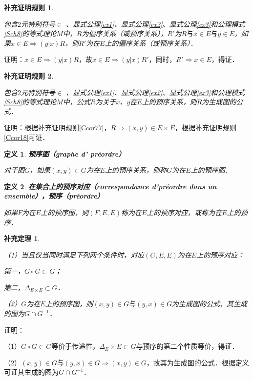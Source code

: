 \documentclass[12pt, a4paper, oneside]{book}
\newtheorem{Ccor}{补充证明规则}
\newtheorem{cor}{补充定理}
\newtheorem{de}{定义}
\begin{document}
			\begin{Ccor}\label{Ccor79}
				\hfill\par
				包含$2$元特别符号$\in$ 、显式公理\ref{ex1}、显式公理\ref{ex2}、显式公理\ref{ex3}和公理模式\ref{Sch8}的等式理论$M$中，$R$为偏序关系（或预序关系），$R'$为$R\text{与}x\in E\text{与}y\in E$，如果$x\in E\Rightarrow (y|x)R$，则$R'$为在$E$上的偏序关系（或预序关系）．
			\end{Ccor}
			证明：$x\in E\Rightarrow (y|x)R$，故$x\in E\Rightarrow (y|x)R'$，同时，$R'\Rightarrow x\in E$，得证．
			
			\begin{Ccor}\label{Ccor80}
				\hfill\par
				包含$2$元特别符号$\in$ 、显式公理\ref{ex1}、显式公理\ref{ex2}、显式公理\ref{ex3}和公理模式\ref{Sch8}的等式理论$M$中，公式$R$为关于$x$、$y$在$E$上的预序关系，则$R$为生成图的公式．
			\end{Ccor}
			证明：根据补充证明规则\ref{Ccor77}，$R\Rightarrow (x, y)\in E\times E$，根据补充证明规则\ref{Ccor18}可证．

			\begin{de}
				\textbf{预序图（graphe d' préordre）}
				\par
				对于图$G$，如果$(x, y)\in G$为在$E$上的预序关系，则称$G$为在$E$上的预序图．
			\end{de}

			\begin{de}
				\textbf{在集合上的预序对应（correspondance d'préordre dans un ensemble），预序（préordre）}
				\par
				如果$F$为在$E$上的预序图，则$(F, E, E)$称为在$E$上的预序对应，或称为在$E$上的预序．
			\end{de}
			
			\begin{cor}\label{cor154}
				\hfill\par
				（1）当且仅当同时满足下列两个条件时，对应$(G, E, E)$为在$E$上的预序对应：
				\par
				第一，$G\circ G\subset G$；
				\par
				第二，$\Delta_{E\times E}\subset G$．
				\par
				（2）$G$为在$E$上的预序图，则$(x, y)\in G\text{与}(y, x)\in G$为生成图的公式，其生成的图为$G\cap G^{-1}$．
			\end{cor}
			证明：
			\par
			（1）$G\circ G\subset G$等价于传递性，$\Delta_E\times E\subset G$与预序的第二个性质等价，得证．
			\par
			（2）$(x, y)\in G\text{与}(y, x)\in G\Rightarrow (x, y)\in G$，故其为生成图的公式．根据定义可证其生成的图为$G\cap G^{-1}$．
			
\end{document}
